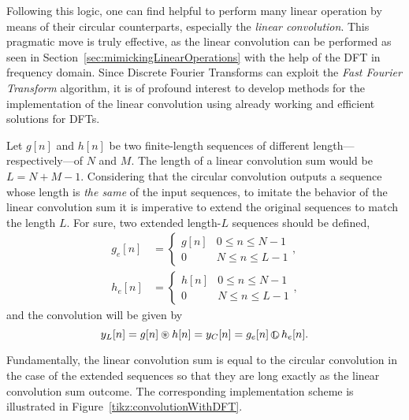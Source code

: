 \documentclass[\documentfontsize, twocolumn]{\classname}
\begin{document}
Following this logic, one can find helpful to perform many linear operation by means of their circular counterparts, especially the \emph{linear convolution}. This pragmatic move is truly effective, as the linear convolution can be performed as seen in Section~\ref{sec:mimickingLinearOperations} with the help of the DFT in frequency domain. Since Discrete Fourier Transforms can exploit the \emph{Fast Fourier Transform} algorithm, it is of profound interest to develop methods for the implementation of the linear convolution using already working and efficient solutions for DFTs.

Let $g[n]$ and $h[n]$ be two finite-length sequences of different length---respectively---of $N$ and $M$. The length of a linear convolution sum would be $L = N + M - 1$. Considering that the circular convolution outputs a sequence whose length is \emph{the same} of the input sequences, to imitate the behavior of the linear convolution sum it is imperative to extend the original sequences to match the length $L$. For sure, two extended length-$L$ sequences should be defined,
\begin{align*}
    g_e[n] &= 
    \left\{\begin{array}{ll}
    g[n] & 0 \leq n \leq N-1\\
    0 & N \leq n \leq L-1
    \end{array}
    \right.,\\
    h_e[n] &= 
    \left\{\begin{array}{ll}
    h[n] & 0 \leq n \leq N-1\\
    0 & N \leq n \leq L-1
    \end{array}
    \right.,
\end{align*}
and the convolution will be given by
\[
    y_L[n] = g[n] \circledast h[n] = y_C[n] = g_e[n] \encircle{L} h_e[n].
\]

Fundamentally, the linear convolution sum is equal to the circular convolution in the case of the extended sequences so that they are long exactly as the linear convolution sum outcome. The corresponding implementation scheme is illustrated in Figure~\ref{tikz:convolutionWithDFT}.
\end{document}
